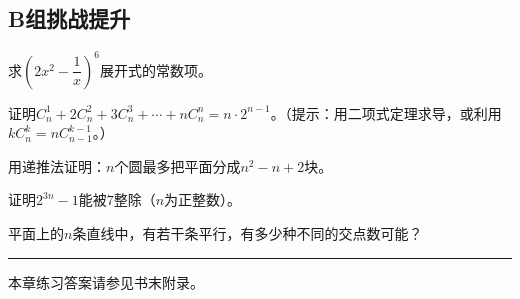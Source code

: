 \subsection*{B组\quad 挑战提升}

\begin{exercise}
\item 求$(2x^2 - \dfrac{1}{x})^6$展开式的常数项。
\item 证明$C_n^1 + 2C_n^2 + 3C_n^3 + \cdots + nC_n^n = n\cdot2^{n-1}$。（提示：用二项式定理求导，或利用$kC_n^k = nC_{n-1}^{k-1}$。）
\item 用递推法证明：$n$个圆最多把平面分成$n^2 - n + 2$块。
\item 证明$2^{3n} - 1$能被$7$整除（$n$为正整数）。
\item 平面上的$n$条直线中，有若干条平行，有多少种不同的交点数可能？
\end{exercise}

\vfill
\noindent\rule{\textwidth}{0.4pt}
本章练习答案请参见书末附录。
